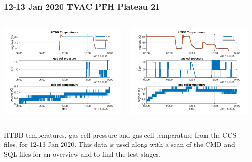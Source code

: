 \documentclass[10pt]{beamer}
\begin{document}
\begin{frame}
\frametitle{12-13 Jan 2020 TVAC PFH Plateau 21}
\begin{columns}[t]
\begin{column}{0.5\textwidth}
  \begin{centering}
  \includegraphics[width=\textwidth]{harvest_01-12/css_summary_12_jan.png}
  \end{centering}\vspace{3mm}

\end{column}
\begin{column}{0.5\textwidth}  
  \begin{centering}
  \includegraphics[width=\textwidth]{harvest_01-12/css_summary_13_jan.png}
  \end{centering}\vspace{3mm}

\end{column}
\end{columns}

HTBB temperatures, gas cell pressure and gas cell temperature from
the CCS files, for 12-13 Jan 2020.  This data is used along with a
scan of the CMD and SQL files for an overview and to find the test
stages. 

\end{frame}
\end{document}
